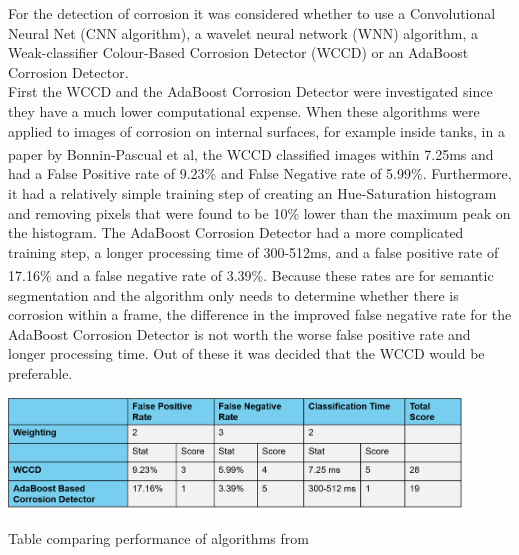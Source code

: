 \documentclass[11pt]{article}		%
\newcommand{\supercite}[1]{\textsuperscript{\cite{#1}}}		%
\begin{document}
	        For the detection of corrosion it was considered whether to use a Convolutional Neural Net (CNN algorithm), a wavelet neural network (WNN) algorithm, a Weak-classifier Colour-Based Corrosion Detector (WCCD) or an AdaBoost Corrosion Detector.
	        \\
	        First the WCCD and the AdaBoost Corrosion Detector were investigated since they have a much lower computational expense. 
	        When these algorithms were applied to images of corrosion on internal surfaces, for example inside tanks, in a paper by Bonnin-Pascual et al\supercite{WCCD}, the WCCD classified images within 7.25ms and had a False Positive rate of 9.23\% and False Negative rate of 5.99\%. Furthermore, it had a relatively simple training step of creating an Hue-Saturation histogram and removing pixels that were found to be 10\% lower than the maximum peak on the histogram.
	        The AdaBoost Corrosion Detector had a more complicated training step, a longer processing time of 300-512ms, and a false positive rate of 17.16\% and a false negative rate of 3.39\%.\supercite{WCCD}  
	        Because these rates are for semantic segmentation and the algorithm only needs to determine whether there is corrosion within a frame, the difference in the improved false negative rate for the AdaBoost Corrosion Detector is not worth the worse false positive rate and longer processing time. 
	        Out of these it was decided that the WCCD would be preferable.  
	        \\
			\begin{table}[h]
				\centering
				\includegraphics[width=0.9\textwidth]{WCCD_corrosion_table}
				\caption{Table comparing performance of algorithms from \cite{WCCD}}
				\label{WCCD_comparison}
			\end{table}
\end{document}
